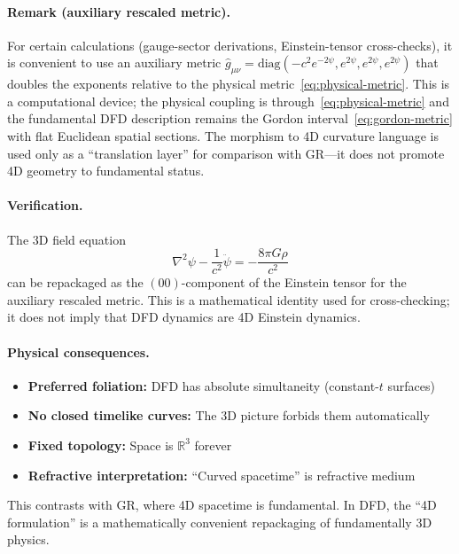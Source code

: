 \paragraph{Remark (auxiliary rescaled metric).}
For certain calculations (gauge-sector derivations, Einstein-tensor cross-checks), it is 
convenient to use an auxiliary metric 
$\hat{g}_{\mu\nu} = \text{diag}(-c^2 e^{-2\psi}, e^{2\psi}, e^{2\psi}, e^{2\psi})$
that doubles the exponents relative to the physical 
metric~\eqref{eq:physical-metric}. This is a computational device; the 
physical coupling is through~\eqref{eq:physical-metric} and the 
fundamental DFD description remains the Gordon 
interval~\eqref{eq:gordon-metric} with flat Euclidean spatial sections. 
The morphism to 4D curvature language is used only as a 
``translation layer'' for comparison with GR---it does not promote 4D geometry 
to fundamental status.

\paragraph{Verification.} The 3D field equation
\begin{equation}
\nabla^2\psi - \frac{1}{c^2}\ddot{\psi} = -\frac{8\pi G\rho}{c^2}
\end{equation}
can be repackaged as the $(00)$-component of the Einstein tensor for the 
auxiliary rescaled metric. This is a mathematical identity used for 
cross-checking; it does not imply that DFD dynamics are 4D Einstein dynamics.

\paragraph{Physical consequences.}
\begin{itemize}
\item \textbf{Preferred foliation:} DFD has absolute simultaneity (constant-$t$ surfaces)
\item \textbf{No closed timelike curves:} The 3D picture forbids them automatically
\item \textbf{Fixed topology:} Space is $\mathbb{R}^3$ forever
\item \textbf{Refractive interpretation:} ``Curved spacetime'' is refractive medium
\end{itemize}

This contrasts with GR, where 4D spacetime is fundamental. In DFD, the ``4D formulation'' 
is a mathematically convenient repackaging of fundamentally 3D physics.

